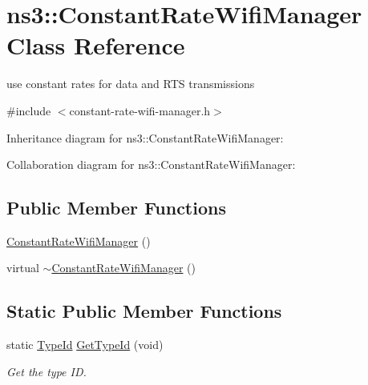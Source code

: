 \hypertarget{classns3_1_1ConstantRateWifiManager}{}\section{ns3\+:\+:Constant\+Rate\+Wifi\+Manager Class Reference}
\label{classns3_1_1ConstantRateWifiManager}


use constant rates for data and R\+TS transmissions  




{\ttfamily \#include $<$constant-\/rate-\/wifi-\/manager.\+h$>$}



Inheritance diagram for ns3\+:\+:Constant\+Rate\+Wifi\+Manager\+:


Collaboration diagram for ns3\+:\+:Constant\+Rate\+Wifi\+Manager\+:
\subsection*{Public Member Functions}
\begin{DoxyCompactItemize}
\item 
\hyperlink{classns3_1_1ConstantRateWifiManager_a4fd548c7d0ee7f6a94ce5869a79afca8}{Constant\+Rate\+Wifi\+Manager} ()
\item 
virtual \hyperlink{classns3_1_1ConstantRateWifiManager_a28ec0551512d2f6f13c1b0f82bfe62e3}{$\sim$\+Constant\+Rate\+Wifi\+Manager} ()
\end{DoxyCompactItemize}
\subsection*{Static Public Member Functions}
\begin{DoxyCompactItemize}
\item 
static \hyperlink{classns3_1_1TypeId}{Type\+Id} \hyperlink{classns3_1_1ConstantRateWifiManager_a8211a39fd45891a5ca0cc3ae9c2aadac}{Get\+Type\+Id} (void)
\begin{DoxyCompactList}\small\item\em Get the type ID. \end{DoxyCompactList}\end{DoxyCompactItemize}
